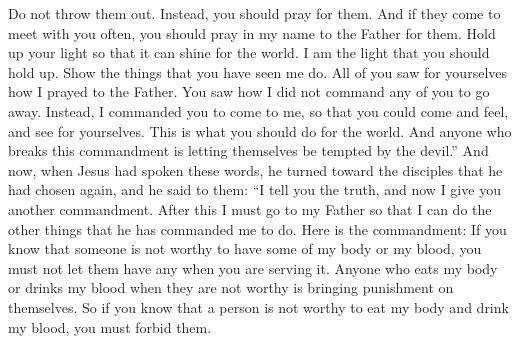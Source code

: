 Do not throw them out. Instead, you should pray for them. And if they come to meet with you often, you should pray in my name to the Father for them.
\bverse \iffalse Therefore, hold up your light that it may shine unto the world. Behold I am the light which ye shall hold up--that which ye have seen me do. Behold ye see that I have prayed unto the Father, and ye all have witnessed. \fi
Hold up your light so that it can shine for the world. I am the light that you should hold up. Show the things that you have seen me do. All of you saw for yourselves how I prayed to the Father.
\bverse \iffalse And ye see that I have commanded that none of you should go away, but rather have commanded that ye should come unto me, that ye might feel and see; even so shall ye do unto the world; and whosoever breaketh this commandment suffereth himself to be led into temptation. \fi
You saw how I did not command any of you to go away. Instead, I commanded you to come to me, so that you could come and feel, and see for yourselves. This is what you should do for the world. And anyone who breaks this commandment is letting themselves be tempted by the devil.''
\bverse \iffalse And now it came to pass that when Jesus had spoken these words, he turned his eyes again upon the disciples whom he had chosen, and said unto them: \fi
And now, when Jesus had spoken these words, he turned toward the disciples that he had chosen again, and he said to them:
\bverse \iffalse Behold verily, verily, I say unto you, I give unto you another commandment, and then I must go unto my Father that I may fulfil other commandments which he hath given me. \fi
``I tell you the truth, and now I give you another commandment. After this I must go to my Father so that I can do the other things that he has commanded me to do.
\bverse \iffalse And now behold, this is the commandment which I give unto you, that ye shall not suffer any one knowingly to partake of my flesh and blood unworthily, when ye shall minister it; \fi
Here is the commandment: If you know that someone is not worthy to have some of my body or my blood, you must not let them have any when you are serving it.
\bverse \iffalse For whoso eateth and drinketh my flesh and blood unworthily eateth and drinketh damnation to his soul; therefore if ye know that a man is unworthy to eat and drink of my flesh and blood ye shall forbid him. \fi
Anyone who eats my body or drinks my blood when they are not worthy is bringing punishment on themselves. So if you know that a person is not worthy to eat my body and drink my blood, you must forbid them.
